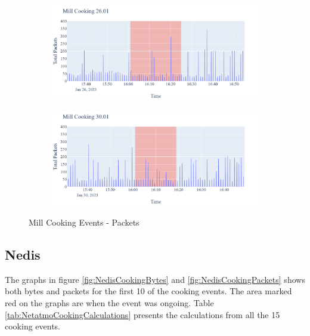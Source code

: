 \begin{figure}[H]
\begin{subfigure}[b]{0.5\textwidth}
        \centering
        \includegraphics[width=1.2\hsize]{figures/Mill_Cooking_Packets_26.01.png}
    \end{subfigure}
    \begin{subfigure}[b]{0.5\textwidth}
        \centering
        \includegraphics[width=1.2\hsize]{figures/Mill_Cooking_Packets_30.01.png}
    \end{subfigure}
    \caption{Mill Cooking Events - Packets}
    \label{fig:MillCookingPackets}
\end{figure}




\subsection{Nedis}
The graphs in figure \ref{fig:NedisCookingBytes} and \ref{fig:NedisCookingPackets} shows both bytes and packets for the first 10 of the cooking events. The area marked red on the graphs are when the event was ongoing. Table \ref{tab:NetatmoCookingCalculations} presents the calculations from all the 15 cooking events. 

